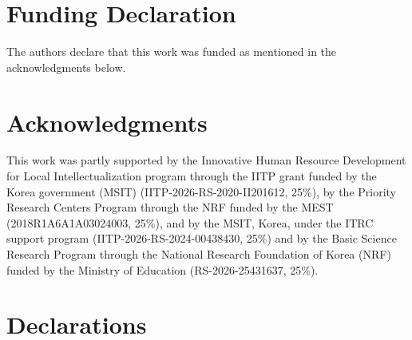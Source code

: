 \documentclass[pdflatex,sn-mathphys-num]{sn-jnl}
\begin{document}

\section*{Funding Declaration}
The authors declare that this work was funded as mentioned in the acknowledgments below.

\section*{Acknowledgments}
This work was partly supported by the Innovative Human Resource Development for Local Intellectualization program through the IITP grant funded by the Korea government (MSIT) (IITP-2026-RS-2020-II201612, 25\%), by the Priority Research Centers Program through the NRF funded by the MEST (2018R1A6A1A03024003, 25\%), and by the MSIT, Korea, under the ITRC support program (IITP-2026-RS-2024-00438430, 25\%) and by the Basic Science Research Program through the National Research Foundation of Korea (NRF) funded by the Ministry of Education (RS-2026-25431637, 25\%).

\section*{Declarations}
\end{document}
